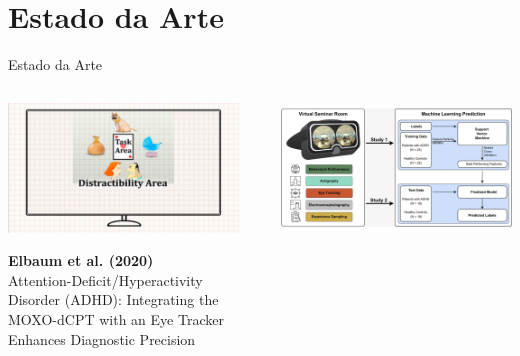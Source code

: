 \documentclass{beamer}
\begin{document}
\section{Estado da Arte}
\begin{frame}{Estado da Arte}
\justifying

\begin{columns}[T,onlytextwidth]

    \begin{column}{0.48\textwidth}
        \centering
        \includegraphics[width=\textwidth]{figuras/elb2020.png}
        
        \vspace{0.4cm}
        \textbf{Elbaum et al. (2020)}\\
        {\small
        Attention-Deficit/Hyperactivity Disorder (ADHD): Integrating the MOXO-dCPT with an Eye Tracker Enhances Diagnostic Precision
        }
    \end{column}

    \begin{column}{0.04\textwidth}
        \rule{0.5pt}{0.75\textheight}
    \end{column}

    \begin{column}{0.48\textwidth}
        \centering
        \includegraphics[width=\textwidth]{figuras/wie2024.png}


\end{column}
\end{columns}
\end{frame}
\end{document}
